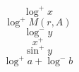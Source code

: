 \documentclass{article}
\begin{document}
\[ \log^+ x \]
\[ \log^+ M(r, A) \]
\[ \log^- y \]
\[ x^+ \]
\[ \sin^+ y \]
\[ \log^+ a + \log^- b \]
\end{document}
